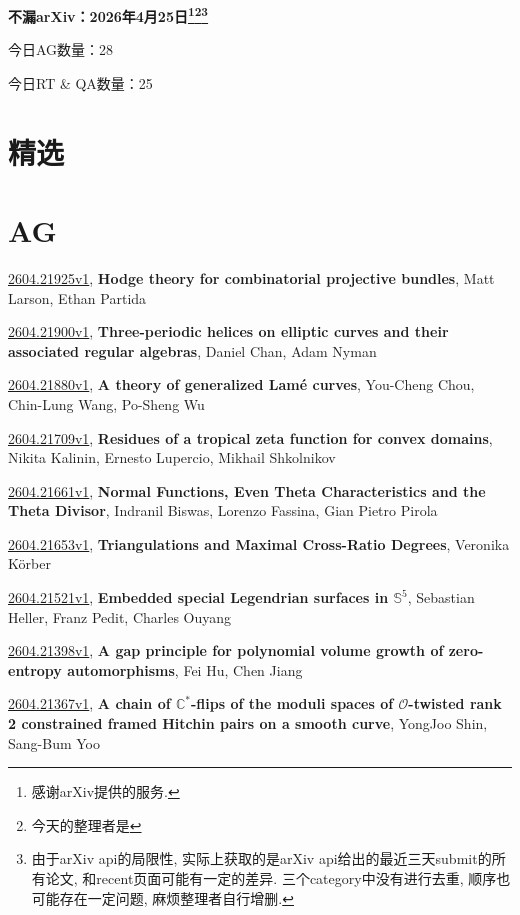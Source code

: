 \documentclass[9pt, a4paper]{article}
\theoremstyle{plain}
\theoremstyle{definition}
\theoremstyle{remark}
\newcommand{\arxiv}[3]{\href{https://arxiv.org/abs/#1}{#1}, \textbf{\textcolor{arxivblue}{#2}}, #3}
\newcommand{\AGnumber}{28}
\newcommand{\RTQAnumber}{25}
\newcommand{\NewestDate}{2026年4月25日}
\newcommand{\todayarXiver}{} %
\begin{document}
\begin{center}
    \Huge\textbf{不漏arXiv：\NewestDate\footnote{感谢arXiv提供的服务.}\footnote{今天的整理者是\todayarXiver}\footnote{由于arXiv api的局限性, 实际上获取的是arXiv api给出的最近三天submit的所有论文, 和recent页面可能有一定的差异. 三个category中没有进行去重, 顺序也可能存在一定问题, 麻烦整理者自行增删.}} \\
\end{center}

\setcounter{section}{-1}

\begin{center}
    今日AG数量：\AGnumber
    
    今日RT \& QA数量：\RTQAnumber
    
\end{center}


\section{精选}


\section{AG}
\arxiv{2604.21925v1}{Hodge theory for combinatorial projective bundles}{Matt Larson, Ethan Partida}

\arxiv{2604.21900v1}{Three-periodic helices on elliptic curves and their associated regular algebras}{Daniel Chan, Adam Nyman}

\arxiv{2604.21880v1}{A theory of generalized Lamé curves}{You-Cheng Chou, Chin-Lung Wang, Po-Sheng Wu}

\arxiv{2604.21709v1}{Residues of a tropical zeta function for convex domains}{Nikita Kalinin, Ernesto Lupercio, Mikhail Shkolnikov}

\arxiv{2604.21661v1}{Normal Functions, Even Theta Characteristics and the Theta Divisor}{Indranil Biswas, Lorenzo Fassina, Gian Pietro Pirola}

\arxiv{2604.21653v1}{Triangulations and Maximal Cross-Ratio Degrees}{Veronika Körber}

\arxiv{2604.21521v1}{Embedded special Legendrian surfaces in $\mathbb S^5$}{Sebastian Heller, Franz Pedit, Charles Ouyang}

\arxiv{2604.21398v1}{A gap principle for polynomial volume growth of zero-entropy automorphisms}{Fei Hu, Chen Jiang}

\arxiv{2604.21367v1}{A chain of $\mathbb{C}^{*}$-flips of the moduli spaces of $\mathcal{O}$-twisted rank 2 constrained framed Hitchin pairs on a smooth curve}{YongJoo Shin, Sang-Bum Yoo}
\end{document}

